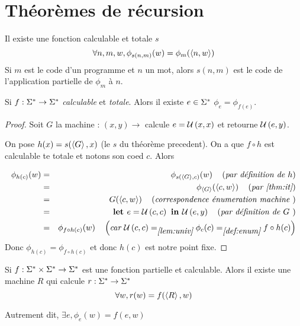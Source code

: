 \section{Théorèmes de récursion}


\begin{theorem}\label{thm:it}
	Il existe une fonction calculable et totale $s$ \tlq
	$$\forall n,m,w, \phi_{s(n,m)}(w) = \phi_m(\left\langle n,w\right\rangle)$$
	Si $m$ est le code d'un programme et $n$ un mot, alors $s(n,m)$ est le code de l'application partielle de $\phi_m$ à $n$.
\end{theorem}

\begin{theorem}
	Si $ f : \Sigma^{*} \to \Sigma^{*}$ \emph{calculable} et \emph {totale}. Alors il existe $e \in \Sigma^{*}$ \tq $\phi_e = \phi_{f(e)}$.
\end{theorem}


\begin{proof}
	Soit $G$ la machine : $(x,y) \to $ calcule $e = \mathcal U \left(x,x\right)$ et retourne $\mathcal U \left(e,y\right)$.

	On pose $h(x) = s(\left\langle G\right\rangle, x)$ (le $s$ du théorème precedent). On a que $f \circ h$ est calculable te totale et notons son coed $c$. Alors

	\begin{eqnarray*}
		\phi_{h(c)} (w) &=& \phi_{s(\left\langle G\right\rangle, c)} (w) \quad\left(\textit{par définition de $h$}\right) \\
		&=& \phi_{\left\langle G\right\rangle} (\left\langle c, w\right\rangle) \quad\left(\textit{par \ref{thm:it}}\right) \\
		&=& G (\left\langle c, w\right\rangle) \quad\left(\textit{correspondence énumeration machine }\right)\\
		&=& \textbf{let } e = \mathcal U \left(c,c\right) \textbf{ in } \mathcal U \left(e,y\right) \quad\left(\textit{par définition de $G$ }\right)\\
		&=& \phi_{f \circ h (c)}(w) \quad\left(\textit{car $\mathcal U \left(c,c\right) =_{\ref{lem:univ}} \phi_c(c) =_{\ref{def:enum}} f \circ h (c)$}\right)
	\end{eqnarray*}
	Donc $\phi_{h(c)} = \phi_{f \circ h (c)}$ et donc $h(c)$ est notre point fixe.
\end{proof}


\begin{theorem}[de récursion]
	Si $f : \Sigma^{*} \times \Sigma^{*} \to \Sigma^{*}$ est une fonction partielle et calculable. Alors il existe une machine $R$ qui calcule $r : \Sigma^{*} \to \Sigma^{*} $ \tq
	$$ \forall w, r(w) =  f (\left\langle R\right\rangle, w)$$

	Autrement dit, $\exists e, \phi_e (w) = f (e, w)$
\end{theorem}


